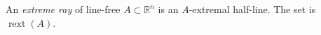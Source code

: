 An \emph{extreme ray} of line-free $A\subset\mathbb{R}^n$ is an $A$-extremal half-line. The set is $\operatorname{rext}(A)$.
